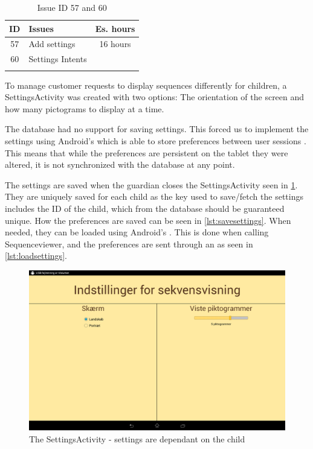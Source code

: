\begin{longtable} { | c | p{12cm} | c | } 
\hline
	ID 	&	Issues	&		 Es. hours \\\hline
	57	&	Add settings	&	16 hours	\\\hline
	60	&	Settings Intents & \\\hline
\caption{Issue ID 57 and 60}
\label{tab:spr4_addsettings}
\end{longtable}

To manage customer requests to display sequences differently for children, a SettingsActivity was created with two options: The orientation of the screen and how many pictograms to display at a time.

The database had no support for saving settings. This forced us to implement the settings using Android's  which is able to store preferences between user sessions \cite{sharedpreferences}. This means that while the preferences are persistent on the tablet they were altered, it is not synchronized with the database at any point.

The settings are saved when the guardian closes the SettingsActivity seen in \ref{fig:profileselector}. They are uniquely saved for each child as the key used to save/fetch the settings includes the ID of the child, which from the database should be guaranteed unique. How the preferences are saved can be seen in \ref{lst:savesettings}. When needed, they can be loaded using Android's . This is done when calling Sequenceviewer, and the preferences are sent through an  as seen in \ref{lst:loadsettings}.

\begin{figure}[H]
	\centering
	\includegraphics[width=\textwidth]{Pics/Sprint4/settings.png}
	\caption{The SettingsActivity - settings are dependant on the child}
	\label{fig:profileselector}
\end{figure}

